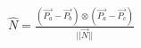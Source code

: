 \begin{equation}
 \begin{aligned}
 \hat{N}=\frac{\left(\vec{P_a}-\vec{P_b}\right)\otimes\left(\vec{P_a}-\vec{P_c}\right)}{||\vec{N}||}\label{eqn:bound001} 
\end{aligned}
\end{equation}
